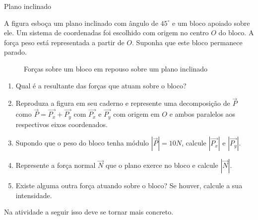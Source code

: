 \begin{task}{ Plano inclinado}
\label{ativ-vetores-plano-inclinado}



A figura esboça um plano inclinado com ângulo de \(45^{\circ}\) e um bloco apoiado sobre ele. Um sistema de coordenadas foi escolhido com origem no centro \(O\) do bloco. A força peso está representada a partir de \(O\). Suponha que este bloco permanece parado.
\begin{figure}[H]\centering{}\caption{Forças sobre um bloco em repouso sobre um plano inclinado}\end{figure}\begin{enumerate}
\item {} 
Qual é a resultante das forças que atuam sobre o bloco?

\item {} 
Reproduza a figura em seu caderno e represente uma decomposição de \(\vec{P}\) como \(\vec{P } = \vec{P_x} + \vec{P_y}\) com \(\vec{P_x}\) e \(\vec{P_y}\) com origem em \(O\) e ambos paralelos aos respectivos eixos coordenados.

\item {} 
Supondo que o peso do bloco tenha módulo \(|\vec{P}|=10 N\), calcule \(|\vec{P_x}|\) e \(|\vec{P_y}|\).

\item {} 
Represente a força normal \(\vec{N}\) que o plano exerce no bloco e calcule \(|\vec{N}|\).

\item {} 
Existe alguma outra força atuando sobre o bloco? Se houver, calcule a sua intensidade.

\end{enumerate}
\end{task}




\know{}

\clearmargin
Na atividade a seguir isso deve se tornar mais concreto.

